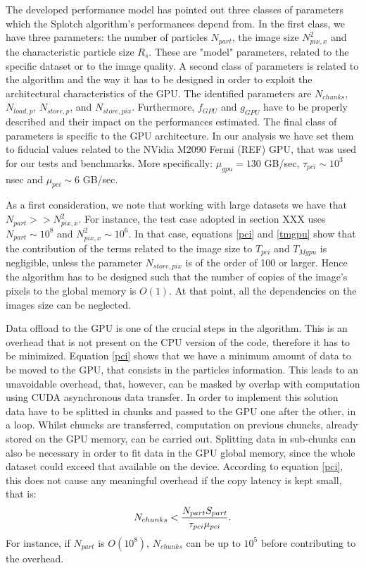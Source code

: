 \documentclass[11pt]{article}
\begin{document}
The developed performance model has pointed out three classes of parameters which the Splotch 
algorithm's performances depend from. In the first class, we have three parameters:
the number of particles $N_{part}$,
the image size $N_{pix,x}^2$ and the characteristic particle size $R_s$. These 
are "model" parameters, related to the specific dataset or to the image quality.
A second class of parameters is related to the algorithm and the way 
it has to be designed in order to exploit the architectural characteristics
of the GPU. The identified parameters are $N_{chunks}$, $N_{load,p}$, 
$N_{store,p}$,  and $N_{store,pix}$. Furthermore, $f_{GPU}$ and 
$g_{GPU}$ have to be properly described and their impact on the performances
estimated. The final class of parameters 
is specific to the GPU architecture. In our analysis we have set them to fiducial
values related to the NVidia M2090 Fermi (REF) GPU, that was used for our
tests and benchmarks. More specifically: 
$\mu_{gpu} = 130$ GB/sec, $\tau_{pci} \sim 10^3$ nsec and
$\mu_{pci} \sim 6$ GB/sec.

As a first consideration, we note that working with large datasets we have that
$N_{part} >> N_{pix,x}^2$. For instance, the test case adopted 
in section XXX uses $N_{part} \sim 10^8$
and $N_{pix,x}^2 \sim 10^6$. 
In that case,
equations \eqref{pci} and \eqref{tmgpu} show that the contribution of the terms
related to the image size to $T_{pci}$ and $T_{Mgpu}$ is negligible, unless the 
parameter $N_{store,pix}$ is of the order of 100 or larger. Hence the algorithm has to
be designed such that the number of copies of the image's pixels to the 
global memory is $O(1)$. At that point, all the dependencies on the images size can
be neglected.

Data offload to the GPU is one of the crucial steps in the algorithm. This is an
overhead that is not present on the CPU version of the code, therefore it has to
be minimized. Equation \eqref{pci} shows that we have a minimum amount of data 
to be moved to the GPU, that consists in the particles information. This leads to an 
unavoidable overhead, that, however, can be masked by overlap with computation using
CUDA asynchronous data transfer. In order to implement this solution data have to be
splitted in chunks and passed to the GPU one after the other, in a loop. Whilst chuncks 
are transferred, computation on previous chuncks, already stored on the GPU
memory, can be carried out. Splitting data in sub-chunks can also be necessary
in order to fit data in the GPU global memory, since the whole dataset could exceed
that available on the device. According to equation \eqref{pci}, this does not 
cause any meaningful overhead if the copy latency is kept small, that is:
\begin{equation}
N_{chunks} < {N_{part} S_{part}\over \tau_{pci}\mu_{pci}}.
\end{equation}
For instance, if $N_{part}$ is $O(10^8)$, $N_{chunks}$ can be up to $10^5$ before
contributing to the overhead.
\end{document}
